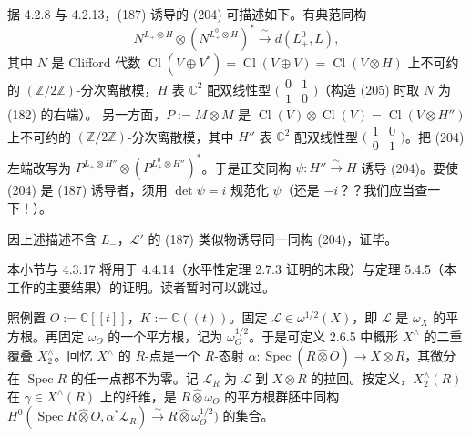 据 4.2.8 与 4.2.13，(187) 诱导的 (204) 可描述如下。有典范同构
\begin{equation}\tag{205}
N^{L_{+}\otimes H}\otimes(N^{L_{+}^{0}\otimes H})^{*}\xrightarrow{\ \sim\ }d(L_{+}^{0},L),
\end{equation}
其中 $N$ 是 Clifford 代数 $\operatorname{Cl}(V\oplus V^{*})=\operatorname{Cl}(V\oplus V)=\operatorname{Cl}(V\otimes H)$ 上不可约的 $(\mathbb{Z}/2\mathbb{Z})$-分次离散模，$H$ 表 $\mathbb{C}^{2}$ 配双线性型 $\bigl(\begin{smallmatrix}0&1\\1&0\end{smallmatrix}\bigr)$（构造 (205) 时取 $N$ 为 (182) 的右端）。
另一方面，$P:=M\otimes M$ 是 $\operatorname{Cl}(V)\otimes\operatorname{Cl}(V)=\operatorname{Cl}(V\otimes H'')$ 上不可约的 $(\mathbb{Z}/2\mathbb{Z})$-分次离散模，其中 $H''$ 表 $\mathbb{C}^{2}$ 配双线性型 $\bigl(\begin{smallmatrix}1&0\\0&1\end{smallmatrix}\bigr)$。把 (204) 左端改写为 $P^{L_{+}\otimes H''}\otimes(P^{L_{+}^{0}\otimes H''})^{*}$。于是正交同构 $\psi:H''\xrightarrow{\ \sim\ }H$ 诱导 (204)。要使 (204) 是 (187) 诱导者，须用 $\det\psi=i$ 规范化 $\psi$（还是 $-i$？？我们应当查一下！）。

因上述描述不含 $L_{-}$，$\mathcal{L}'$ 的 (187) 类似物诱导同一同构 (204)，证毕。

 本小节与 4.3.17 将用于 4.4.14（水平性定理 2.7.3 证明的末段）与定理 5.4.5（本工作的主要结果）的证明。读者暂时可以跳过。

照例置 $O:=\mathbb{C}[[t]]$，$K:=\mathbb{C}((t))$。固定 $\mathcal{L}\in\omega^{1/2}(X)$，即 $\mathcal{L}$ 是 $\omega_{X}$ 的平方根。再固定 $\omega_{O}$ 的一个平方根，记为 $\omega_{O}^{1/2}$。于是可定义 2.6.5 中概形 $X^{\wedge}$ 的二重覆叠 $X_{2}^{\wedge}$。回忆 $X^{\wedge}$ 的 $R$-点是一个 $R$-态射 $\alpha:\operatorname{Spec}(R\hat{\otimes}O)\to X\otimes R$，其微分在 $\operatorname{Spec} R$ 的任一点都不为零。记 $\mathcal{L}_{R}$ 为 $\mathcal{L}$ 到 $X\otimes R$ 的拉回。按定义，$X_{2}^{\wedge}(R)$ 在 $\gamma\in X^{\wedge}(R)$ 上的纤维，是 $R\hat{\otimes}\omega_{O}$ 的平方根群胚中同构 $H^{0}(\operatorname{Spec} R\hat{\otimes}O,\alpha^{*}\mathcal{L}_{R})\xrightarrow{\ \sim\ }R\hat{\otimes}\omega_{O}^{1/2})$ 的集合。

